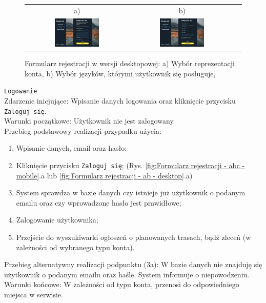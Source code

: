 \begin{figure}[H]
 \centering
  \begin{tabular}{@{}ccc@{}}
  a) & b)\\
  \includegraphics[width=0.45\textwidth]{rozdzial1/wybor_2_d.jpg} &
  \includegraphics[width=0.45\textwidth]{rozdzial1/wybor_3_d.jpg}
  \end{tabular}
 \caption{Formularz rejestracji w wersji desktopowej: a) Wybór reprezentacji konta, b) Wybór języków, którymi użytkownik się posługuje, }
 \label{fig:Formularz rejestracji - ab2 - desktop}
\end{figure}

\texttt{Logowanie} \\
Zdarzenie inicjujące: Wpisanie danych logowania oraz kliknięcie przycisku \texttt{Zaloguj się}. \\
Warunki początkowe: Użytkownik nie jest zalogowany. \\
Przebieg podstawowy realizacji przypadku użycia:
\begin{enumerate}
    \item Wpisanie danych, email oraz hasło:
    \item Kliknięcie przycisku \texttt{Zaloguj się}; (Rys. \ref{fig:Formularz rejestracji - abc - mobile}.a lub \ref{fig:Formularz rejestracji - ab - desktop}.a)
    \item System sprawdza w bazie danych czy istnieje już użytkownik o podanym emailu oraz czy wprowadzone hasło jest prawidłowe;
    \item Zalogowanie użytkownika;
    \item Przejście do wyszukiwarki ogłoszeń o planowanych trasach, bądź zleceń (w zależności od wybranego typu konta).
\end{enumerate}
Przebieg alternatywny realizacji podpunktu (3a): W bazie danych nie znajduję się użytkownik o podanym emailu oraz haśle. System informuje o niepowodzeniu. \\
Warunki końcowe: W zależności od typu konta, przenosi do odpowiedniego miejsca w serwisie.\\

